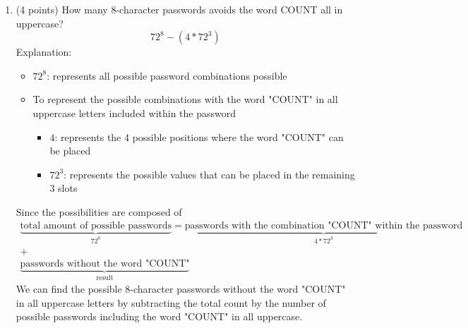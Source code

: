 \documentclass[10pt,letterpaper,unboxed,cm]{article}
\begin{document}
\begin{enumerate}
\begin{enumerate}
\item
(4 points)
How many 8-character passwords avoids the word COUNT all in uppercase?
$$
72^8-(4*72^3)
$$
Explanation:
\begin{itemize}
    \item $72^8$: represents all possible password combinations possible
    \item To represent the possible combinations with the word "COUNT" in all uppercase letters included within the password
    \begin{itemize}
        \item $4$: represents the 4 possible positions where the word "COUNT" can be placed
        \item $72^3$: represents the possible values that can be placed in the remaining 3 slots
    \end{itemize}
\end{itemize}
Since the possibilities are composed of 
\begin{align*}
    \underbrace{\text{total amount of possible passwords}}_{72^8} = \underbrace{\text{passwords with the combination "COUNT" within the password}}_{4*72^3}\\ 
    + \\
    \underbrace{\text{passwords without the word "COUNT"}}_{\text{result}}
\end{align*}
We can find the possible 8-character passwords without the word "COUNT" in all uppercase letters by subtracting the total count by the number of possible passwords including the word "COUNT" in all uppercase.


\end{enumerate}
\end{enumerate}
\end{document}

